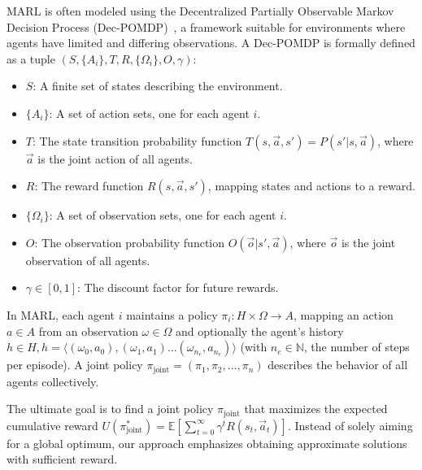 \documentclass[conference]{IEEEtran}
\begin{document}
MARL is often modeled using the Decentralized Partially Observable Markov Decision Process (Dec-POMDP)~\cite{Beynier2013}, a framework suitable for environments where agents have limited and differing observations. A Dec-POMDP is formally defined as a tuple $(S, \{A_i\}, T, R, \{\Omega_i\}, O, \gamma)$:

\begin{itemize}
    \item $S$: A finite set of states describing the environment.
    \item $\{A_i\}$: A set of action sets, one for each agent $i$.
    \item $T$: The state transition probability function $T(s, \vec{a}, s') = P(s'|s, \vec{a})$, where $\vec{a}$ is the joint action of all agents.
    \item $R$: The reward function $R(s, \vec{a}, s')$, mapping states and actions to a reward.
    \item $\{\Omega_i\}$: A set of observation sets, one for each agent $i$.
    \item $O$: The observation probability function $O(\vec{o} | s', \vec{a})$, where $\vec{o}$ is the joint observation of all agents.
    \item $\gamma \in [0,1]$: The discount factor for future rewards.
\end{itemize}

In MARL, each agent $i$ maintains a policy $\pi_i: H \times \Omega \rightarrow A$, mapping an action $a \in A$ from an observation $\omega \in \Omega$ and optionally the agent's history $h \in H, h=\langle(\omega_0,a_0),(\omega_1,a_1)\dots(\omega_{n_e},a_{n_e})\rangle$ (with $n_e \in \mathbb{N}$, the number of steps per episode). A joint policy $\pi_{\text{joint}} = (\pi_1, \pi_2, \ldots, \pi_n)$ describes the behavior of all agents collectively.

The ultimate goal is to find a joint policy $\pi_{\text{joint}}$ that maximizes the expected cumulative reward $U(\pi^*_{\text{joint}}) = \mathbb{E}\left[\sum_{t=0}^{\infty} \gamma^t R(s_t, \vec{a}_t)\right]$. Instead of solely aiming for a global optimum, our approach emphasizes obtaining approximate solutions with sufficient reward.
\end{document}
